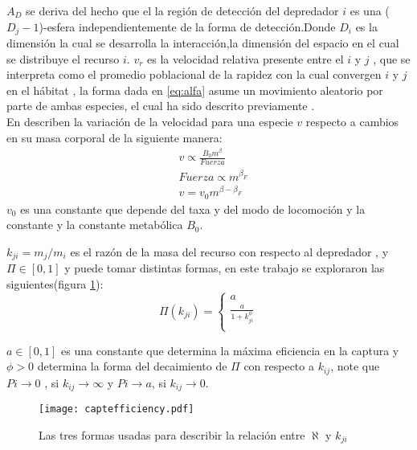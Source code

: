 $A_D$ se deriva del hecho que el la regi\'on de detecci\'on del depredador $i$ es una ($D_j-1$)-esfera independientemente de la forma de detecci\'on\citep{pawar2012dimensionality}.Donde $D_i$ es la dimensi\'on la cual se desarrolla la interacci\'on,la dimensi\'on del espacio en el cual se distribuye el recurso $i$.
$v_r$ es la velocidad relativa presente entre el $i$ y $j$ , que se interpreta como el promedio poblacional de la rapidez con la cual convergen $i$ y $j$ en el h\'abitat \citep[supinfo.]{pawar2012dimensionality} , la forma dada en \eqref{eq:alfa} asume un movimiento aleatorio por parte de ambas especies, el cual ha sido descrito previamente \citep{okubo2001diffusion}.\\
En \cite{pawar2012dimensionality} describen la variaci\'on de la velocidad para una especie $v$ respecto a cambios en su masa corporal de la siguiente manera:
\begin{equation}\label{eq:vel}
\begin{aligned}
&v \propto \frac{B_0 m^\beta}{Fuerza}\\
&Fuerza \propto m^{\beta_F} \\
&v = v_0m^{\beta - \beta_F}
\end{aligned}
\end{equation}
$v_0$ es una constante que depende del taxa y del modo de locomoci\'on y la constante y la constante metab\'olica $B_0$.\\ 

$k_{ji}= m_j/m_i$ es el raz\'on de la masa del recurso con respecto al depredador , y $\Pi \in [0,1]$ y  puede tomar distintas formas\citep{weitz2006size}, en este trabajo se exploraron las siguientes(figura \ref{fig:efficiency}): 
\begin{equation}\label{eq:sr}
\Pi(k_{ji}) =
\begin{cases}
a\\
\frac{a}{1+k_{ji}^\phi} \\
\end{cases}
\end{equation}

$a \in [0,1] $ es una constante que determina la m\'axima eficiencia en la captura y $\phi > 0 $ determina la forma del decaimiento de $\Pi$ con respecto a $k_{ij}$, note que $Pi \to 0$ , si $k_{ij} \to \infty$ y $Pi \to a $, si $k_{ij} \to 0$.

\begin{figure}
\begin{center}
 \texttt{[image: captefficiency.pdf]}
 \caption[formas para $\aleph$]{Las tres formas usadas para describir la relaci\'on entre $\aleph$ y $k_{ji}$}
 \label{fig:efficiency} 
\end{center}
\end{figure}

